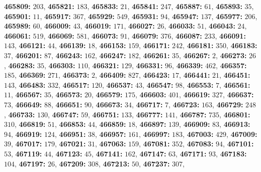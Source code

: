 \textsf{\bfseries 465809:} $203$, \textsf{\bfseries 465821:} $183$, \textsf{\bfseries 465833:} $21$, \textsf{\bfseries 465841:} $247$, \textsf{\bfseries 465887:} $61$, \textsf{\bfseries 465893:} $35$, \textsf{\bfseries 465901:} $11$, \textsf{\bfseries 465917:} $367$, \textsf{\bfseries 465929:} $549$, \textsf{\bfseries 465931:} $94$, \textsf{\bfseries 465947:} $137$, \textsf{\bfseries 465977:} $206$, \textsf{\bfseries 465989:} $60$, \textsf{\bfseries 466009:} $43$, \textsf{\bfseries 466019:} $171$, \textsf{\bfseries 466027:} $26$, \textsf{\bfseries 466033:} $51$, \textsf{\bfseries 466043:} $24$, \textsf{\bfseries 466061:} $519$, \textsf{\bfseries 466069:} $581$, \textsf{\bfseries 466073:} $91$, \textsf{\bfseries 466079:} $376$, \textsf{\bfseries 466087:} $233$, \textsf{\bfseries 466091:} $143$, \textsf{\bfseries 466121:} $44$, \textsf{\bfseries 466139:} $18$, \textsf{\bfseries 466153:} $159$, \textsf{\bfseries 466171:} $242$, \textsf{\bfseries 466181:} $350$, \textsf{\bfseries 466183:} $37$, \textsf{\bfseries 466201:} $87$, \textsf{\bfseries 466243:} $162$, \textsf{\bfseries 466247:} $182$, \textsf{\bfseries 466261:} $35$, \textsf{\bfseries 466267:} $2$, \textsf{\bfseries 466273:} $26$, \textsf{\bfseries 466283:} $35$, \textsf{\bfseries 466303:} $110$, \textsf{\bfseries 466321:} $129$, \textsf{\bfseries 466331:} $96$, \textsf{\bfseries 466339:} $462$, \textsf{\bfseries 466357:} $185$, \textsf{\bfseries 466369:} $271$, \textsf{\bfseries 466373:} $2$, \textsf{\bfseries 466409:} $827$, \textsf{\bfseries 466423:} $17$, \textsf{\bfseries 466441:} $21$, \textsf{\bfseries 466451:} $143$, \textsf{\bfseries 466483:} $332$, \textsf{\bfseries 466517:} $120$, \textsf{\bfseries 466537:} $43$, \textsf{\bfseries 466547:} $98$, \textsf{\bfseries 466553:} $7$, \textsf{\bfseries 466561:} $11$, \textsf{\bfseries 466567:} $35$, \textsf{\bfseries 466573:} $20$, \textsf{\bfseries 466579:} $175$, \textsf{\bfseries 466603:} $401$, \textsf{\bfseries 466619:} $327$, \textsf{\bfseries 466637:} $73$, \textsf{\bfseries 466649:} $88$, \textsf{\bfseries 466651:} $90$, \textsf{\bfseries 466673:} $34$, \textsf{\bfseries 466717:} $7$, \textsf{\bfseries 466723:} $163$, \textsf{\bfseries 466729:} $248$, \textsf{\bfseries 466733:} $130$, \textsf{\bfseries 466747:} $59$, \textsf{\bfseries 466751:} $133$, \textsf{\bfseries 466777:} $141$, \textsf{\bfseries 466787:} $735$, \textsf{\bfseries 466801:} $310$, \textsf{\bfseries 466819:} $51$, \textsf{\bfseries 466853:} $44$, \textsf{\bfseries 466859:} $18$, \textsf{\bfseries 466897:} $139$, \textsf{\bfseries 466909:} $83$, \textsf{\bfseries 466913:} $94$, \textsf{\bfseries 466919:} $124$, \textsf{\bfseries 466951:} $38$, \textsf{\bfseries 466957:} $161$, \textsf{\bfseries 466997:} $183$, \textsf{\bfseries 467003:} $429$, \textsf{\bfseries 467009:} $39$, \textsf{\bfseries 467017:} $179$, \textsf{\bfseries 467021:} $31$, \textsf{\bfseries 467063:} $159$, \textsf{\bfseries 467081:} $352$, \textsf{\bfseries 467083:} $94$, \textsf{\bfseries 467101:} $53$, \textsf{\bfseries 467119:} $44$, \textsf{\bfseries 467123:} $45$, \textsf{\bfseries 467141:} $162$, \textsf{\bfseries 467147:} $63$, \textsf{\bfseries 467171:} $93$, \textsf{\bfseries 467183:} $104$, \textsf{\bfseries 467197:} $26$, \textsf{\bfseries 467209:} $308$, \textsf{\bfseries 467213:} $50$, \textsf{\bfseries 467237:} $307$, 
